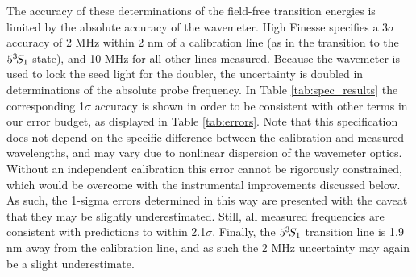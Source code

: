 	The accuracy of these determinations of the field-free transition energies is limited by the absolute accuracy of the wavemeter.
	High Finesse specifies \cite{HighFinesseDoc} a 3$\sigma$ accuracy of 2 MHz within 2 nm of a calibration line (as in the transition to the $5^{3\!} S_1$ state), and 10 MHz for all other lines measured.
	Because the wavemeter is used to lock the seed light for the doubler, the uncertainty is doubled in determinations of the absolute probe frequency.
	In Table \ref{tab:spec_results} the corresponding 1$\sigma$ accuracy is shown in order to be consistent with other terms in our error budget, as displayed in Table \ref{tab:errors}.
	Note that this specification does not depend on the specific difference between the calibration and measured wavelengths, and may vary due to nonlinear dispersion of the wavemeter optics.
	Without an independent calibration this error cannot be rigorously constrained, which would be overcome with the instrumental improvements discussed below.
	As such, the 1-sigma errors determined in this way are presented with the caveat that they may be slightly underestimated.
	Still, all measured frequencies are consistent with predictions to within 2.1$\sigma$.
	Finally, the $5^{3\!} S_1$ transition line is 1.9 nm away from the calibration line, and as such the 2 MHz uncertainty may again be a slight underestimate.

